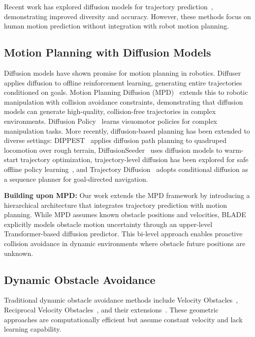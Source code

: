 \documentclass[letterpaper, 10 pt, conference]{ieeeconf}
\begin{document}
Recent work has explored diffusion models for trajectory prediction~\cite{gu2022stochastic, mao2023leapfrog, rempe2023trace}, demonstrating improved diversity and accuracy. However, these methods focus on human motion prediction without integration with robot motion planning.

\subsection{Motion Planning with Diffusion Models}

Diffusion models have shown promise for motion planning in robotics. Diffuser~\cite{janner2022planning} applies diffusion to offline reinforcement learning, generating entire trajectories conditioned on goals. Motion Planning Diffusion (MPD)~\cite{carvalho2023motion} extends this to robotic manipulation with collision avoidance constraints, demonstrating that diffusion models can generate high-quality, collision-free trajectories in complex environments. Diffusion Policy~\cite{chi2023diffusion} learns visuomotor policies for complex manipulation tasks. More recently, diffusion-based planning has been extended to diverse settings: DIPPEST~\cite{stamatopoulou2024dippest} applies diffusion path planning to quadruped locomotion over rough terrain, DiffusionSeeder~\cite{huang2024diffusionseeder} uses diffusion models to warm-start trajectory optimization, trajectory-level diffusion has been explored for safe offline policy learning~\cite{romer2024safe}, and Trajectory Diffusion~\cite{yu2024trajectory} adopts conditional diffusion as a sequence planner for goal-directed navigation.

\textbf{Building upon MPD:} Our work extends the MPD framework by introducing a hierarchical architecture that integrates trajectory prediction with motion planning. While MPD assumes known obstacle positions and velocities, BLADE explicitly models obstacle motion uncertainty through an upper-level Transformer-based diffusion predictor. This bi-level approach enables proactive collision avoidance in dynamic environments where obstacle future positions are unknown.

\subsection{Dynamic Obstacle Avoidance}

Traditional dynamic obstacle avoidance methods include Velocity Obstacles~\cite{fiorini1998motion}, Reciprocal Velocity Obstacles~\cite{van2008reciprocal}, and their extensions~\cite{van2011reciprocal, bareiss2015generalized}. These geometric approaches are computationally efficient but assume constant velocity and lack learning capability.
\end{document}
